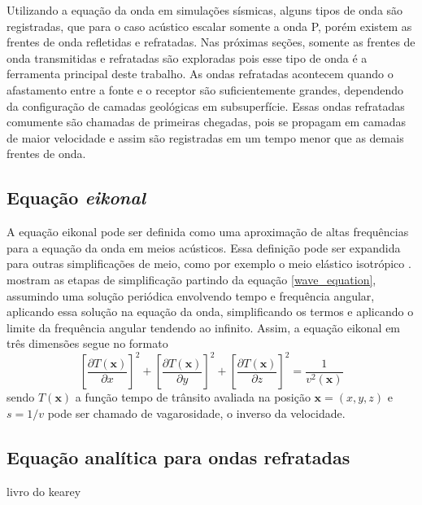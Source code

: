 Utilizando a equação da onda em simulações sísmicas, alguns tipos de onda são registradas, que para o caso acústico escalar somente a onda P, porém existem as frentes de onda refletidas e refratadas. Nas próximas seções, somente as frentes de onda transmitidas e refratadas são exploradas pois esse tipo de onda é a ferramenta principal deste trabalho. As ondas refratadas acontecem quando o afastamento entre a fonte e o receptor são suficientemente grandes, dependendo da configuração de camadas geológicas em subsuperfície. Essas ondas refratadas comumente são chamadas de primeiras chegadas, pois se propagam em camadas de maior velocidade e assim são registradas em um tempo menor que as demais frentes de onda.          

\subsection*{Equação \textit{eikonal}}

A equação eikonal pode ser definida como uma aproximação de altas frequências para a equação da onda em meios acústicos. Essa definição pode ser expandida para outras simplificações de meio, como por exemplo o meio elástico isotrópico \cite{cerveny2003seismic}.  mostram as etapas de simplificação partindo da equação \ref{wave_equation}, assumindo uma solução periódica envolvendo tempo e frequência angular, aplicando essa solução na equação da onda, simplificando os termos e aplicando o limite da frequência angular tendendo ao infinito. Assim, a equação eikonal em três dimensões segue no formato 
\begin{equation}
	\left[\dfrac{\partial T(\mathbf{x})}{\partial x}\right]^2 + \left[\dfrac{\partial T(\mathbf{x})}{\partial y}\right]^2 + \left[\dfrac{\partial T(\mathbf{x})}{\partial z}\right]^2 = \dfrac{1}{v^2(\mathbf{x})} 	
\end{equation} 
\noindent sendo $T(\mathbf{x})$ a função tempo de trânsito avaliada na posição $\mathbf{x} = (x,y,z)$ e $s = 1/v$ pode ser chamado de vagarosidade, o inverso da velocidade. 





\subsection*{Equação analítica para ondas refratadas}

livro do kearey \cite{kearey2002introduction}



